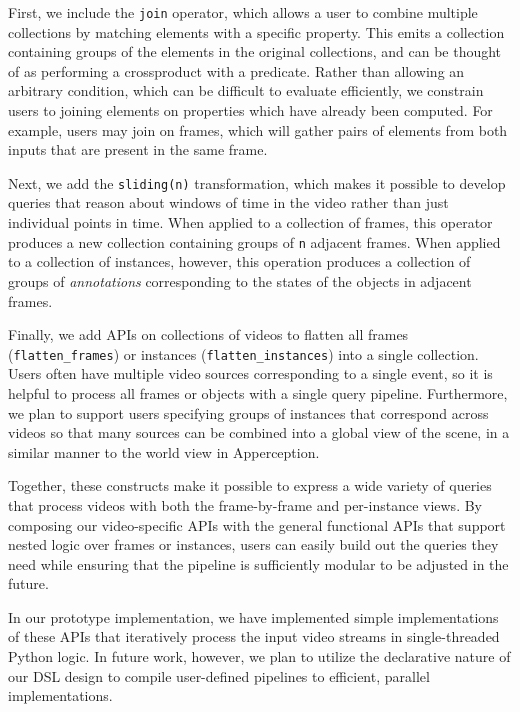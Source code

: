 First, we include the \texttt{join} operator, which allows a user to combine multiple collections by matching elements with a specific property. This emits a collection containing groups of the elements in the original collections, and can be thought of as performing a crossproduct with a predicate. Rather than allowing an arbitrary condition, which can be difficult to evaluate efficiently, we constrain users to joining elements on properties which have already been computed. For example, users may join on frames, which will gather pairs of elements from both inputs that are present in the same frame.

Next, we add the \texttt{sliding(n)} transformation, which makes it possible to develop queries that reason about windows of time in the video rather than just individual points in time. 
When applied to a collection of frames, this operator produces a new collection containing groups of \texttt{n} adjacent frames. 
When applied to a collection of instances, however, this operation produces a collection of groups of \emph{annotations} corresponding to the states of the objects in adjacent frames.

Finally, we add APIs on collections of videos to flatten all frames (\texttt{flatten\_frames}) or instances (\texttt{flatten\_instances}) into a single collection. Users often have multiple video sources corresponding to a single event, so it is helpful to process all frames or objects with a single query pipeline. Furthermore, we plan to support users specifying groups of instances that correspond across videos so that many sources can be combined into a global view of the scene, in a similar manner to the world view in Apperception.

Together, these constructs make it possible to express a wide variety of queries that process videos with both the frame-by-frame and per-instance views. By composing our video-specific APIs with the general functional APIs that support nested logic over frames or instances, users can easily build out the queries they need while ensuring that the pipeline is sufficiently modular to be adjusted in the future.

In our prototype implementation, we have implemented simple implementations of these APIs that iteratively process the input video streams in single-threaded Python logic. In future work, however, we plan to utilize the declarative nature of our DSL design to compile user-defined pipelines to efficient, parallel implementations.
